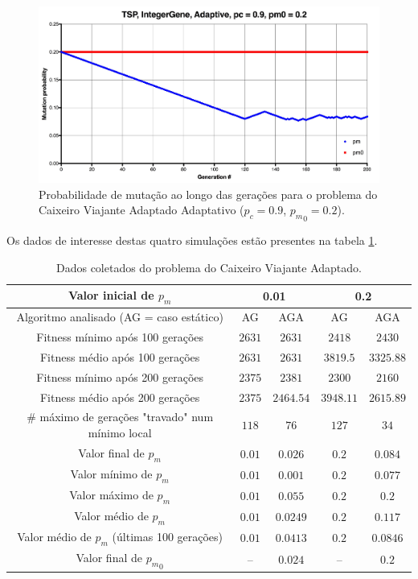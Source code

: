 \begin{figure}[ht!]
    \centering \includegraphics[width=1.0\textwidth]{tsp_02_adaptive_pm.jpg}
    \caption{Probabilidade de mutação ao longo das gerações para o problema do Caixeiro Viajante Adaptado Adaptativo ($p_c=0.9$, ${p_m}_0=0.2$).}
    \label{fig:tsp_02_adaptive_pm}
\end{figure}

Os dados de interesse destas quatro simulações estão presentes na tabela \ref{tab:tsp}.

\begin{table}
\caption{Dados coletados do problema do Caixeiro Viajante Adaptado.}
\label{tab:tsp}

\centering
\begin{tabular}[!hbt]{|c|cc|cc|}
	\hline
	Valor inicial de $p_m$								& \multicolumn{2}{c|}{0.01}		& \multicolumn{2}{c|}{0.2}	\\
	\hline
	Algoritmo analisado (AG = caso estático)			& AG		& AGA		& AG		& AGA		\\
	\hline
	Fitness mínimo após 100 gerações					& $2631$	& $2631$	& $2418$	& $2430$	\\
	Fitness médio após 100 gerações						& $2631$	& $2631$	& $3819.5$	& $3325.88$	\\
	Fitness mínimo após 200 gerações 					& $2375$	& $2381$	& $2300$	& $2160$	\\
	Fitness médio após 200 gerações 					& $2375$	& $2464.54$	& $3948.11$	& $2615.89$	\\
	\# máximo de gerações "travado" num mínimo local	& $118$		& $76$		& $127$		& $34$		\\
	Valor final de $p_m$								& $0.01$	& $0.026$	& $0.2$		& $0.084$	\\
	Valor mínimo de $p_m$								& $0.01$	& $0.001$	& $0.2$		& $0.077$	\\
	Valor máximo de $p_m$								& $0.01$	& $0.055$	& $0.2$		& $0.2$		\\
	Valor médio de $p_m$								& $0.01$	& $0.0249$	& $0.2$		& $0.117$	\\
	Valor médio de $p_m$ (últimas 100 gerações)			& $0.01$	& $0.0413$	& $0.2$		& $0.0846$	\\
	Valor final de ${p_m}_0$							& --		& $0.024$	& --		& $0.2$		\\
	\hline
\end{tabular}
\end{table}

